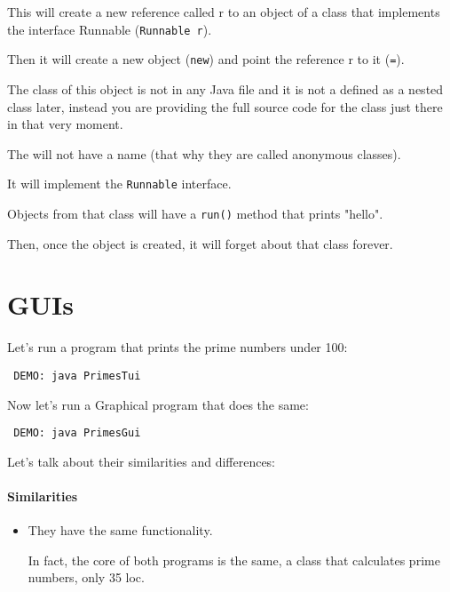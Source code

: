 \documentclass[a4paper, 9pt]{extarticle}
\begin{document}
This will create a new reference called r to an object of a class that
implements the interface Runnable (\verb+Runnable r+).

Then it will create a new object (\verb+new+) and point the reference r to it
(\verb+=+).

The class of this object is not in any Java file and it is not a defined as a
nested class later, instead you are providing the full source code for the
class just there in that very moment.

The will not have a name (that why they are called anonymous classes).

It will implement the \verb+Runnable+ interface.

Objects from that class will have a \verb+run()+ method that prints "hello".

Then, once the object is created, it will forget about that class forever.












\section{GUIs}

Let's run a program that prints the prime numbers under 100:

\verb+ DEMO: java PrimesTui+

Now let's run a Graphical program that does the same:

\verb+ DEMO: java PrimesGui+

Let's talk about their similarities and differences:

\paragraph{Similarities}

\begin{itemize}

  \item They have the same functionality.

    In fact, the core of both programs is the same, a class that calculates
    prime numbers, only 35 loc.

\end{itemize}
\end{document}
